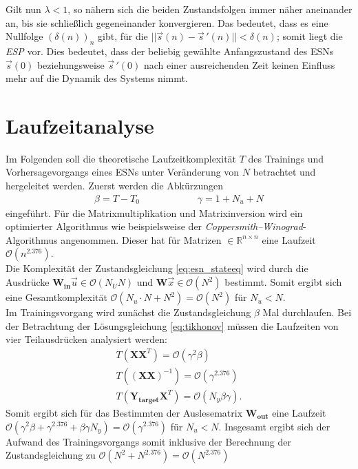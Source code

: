 \begin{appendices}
Gilt nun $\lambda < 1$, so nähern sich die beiden Zustandsfolgen immer näher aneinander an, bis sie schließlich gegeneinander konvergieren. Das bedeutet, dass es eine Nullfolge $(\delta(n))_n$ gibt, für die $||\vec{s}(n) - \vec{s}\,'(n)|| < \delta(n)$; somit liegt die \textit{ESP} vor. Dies bedeutet, dass der beliebig gewählte Anfangszustand des \textsc{ESN}s $\vec{s}(0)$ beziehungsweise $\vec{s}\,'(0)$ nach einer ausreichenden Zeit keinen Einfluss mehr auf die Dynamik des Systems nimmt.

\section{Laufzeitanalyse}
\label{sc:apx_runtime_complexity}
Im Folgenden soll die theoretische Laufzeitkomplexität $T$ des Trainings und Vorhersagevorgangs eines \textsc{ESN}s unter Veränderung von $N$ betrachtet und hergeleitet werden.
Zuerst werden die Abkürzungen
\begin{align*}
\beta = T-T_{0} \qquad\qquad\qquad \gamma = 1+N_u+N
\end{align*}
eingeführt. Für die Matrixmultiplikation und Matrixinversion wird ein optimierter Algorithmus wie beispielsweise der \textit{Coppersmith–Winograd}-Algorithmus angenommen. Dieser hat für Matrizen $\in \mathbb{R}^{n \times n}$ eine Laufzeit $\mathcal{O}(n^{2.376})$. \\
Die Komplexität der Zustandsgleichung \ref{eq:esn_stateeq} wird durch die Ausdrücke $\mathbf{W_{in}} \vec{u} \in \mathcal{O}(N_U N)$ und $\mathbf{W}\vec{x} \in \mathcal{O}(N^2)$ bestimmt. Somit ergibt sich eine Gesamtkomplexität $\mathcal{O}(N_u \cdot N + N^2) = \mathcal{O}(N^2)$ für $N_u < N$.\\

Im Trainingsvorgang wird zunächst die Zustandsgleichung $\beta$ Mal durchlaufen. Bei der Betrachtung der Lösungsgleichung \ref{eq:tikhonov} müssen die Laufzeiten von vier Teilausdrücken analysiert werden:
\begin{align*}
T\left(\mathbf{X}\mathbf{X}^T \right) = \mathcal{O}(\gamma^2 \beta) \\
T\left((\mathbf{X}\mathbf{X})^{-1} \right) = \mathcal{O}(\gamma^{2.376}) \\
T\left(\mathbf{Y_{target}}\mathbf{X}^T \right) = \mathcal{O}(N_y \beta \gamma).
\end{align*}
Somit ergibt sich für das Bestimmten der Auslesematrix $\mathbf{W_{out}}$ eine Laufzeit $\mathcal{O}(\gamma^2 \beta + \gamma^{2.376} + \beta \gamma N_y) = \mathcal{O}(\gamma^{2.376})$  für $N_u < N$.
Insgesamt ergibt sich der Aufwand des Trainingsvorgangs somit inklusive der Berechnung der Zustandsgleichung zu $\mathcal{O}(N^2 + N^{2.376}) = \mathcal{O}(N^{2.376})$\\


\end{appendices}

